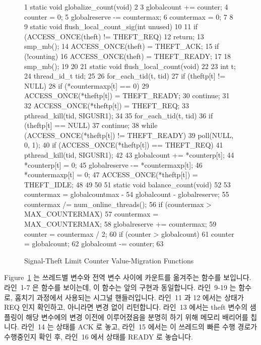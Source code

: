 \begin{figure}[tbp]
{ \scriptsize
\begin{verbbox}
  1 static void globalize_count(void)
  2 {
  3   globalcount += counter;
  4   counter = 0;
  5   globalreserve -= countermax;
  6   countermax = 0;
  7 }
  8 
  9 static void flush_local_count_sig(int unused)
 10 {
 11   if (ACCESS_ONCE(theft) != THEFT_REQ)
 12     return;
 13   smp_mb();
 14   ACCESS_ONCE(theft) = THEFT_ACK;
 15   if (!counting) {
 16     ACCESS_ONCE(theft) = THEFT_READY;
 17   }
 18   smp_mb();
 19 }
 20 
 21 static void flush_local_count(void)
 22 {
 23   int t;
 24   thread_id_t tid;
 25 
 26   for_each_tid(t, tid)
 27     if (theftp[t] != NULL) {
 28       if (*countermaxp[t] == 0) {
 29         ACCESS_ONCE(*theftp[t]) = THEFT_READY;
 30         continue;
 31       }
 32       ACCESS_ONCE(*theftp[t]) = THEFT_REQ;
 33       pthread_kill(tid, SIGUSR1);
 34     }
 35   for_each_tid(t, tid) {
 36     if (theftp[t] == NULL)
 37       continue;
 38     while (ACCESS_ONCE(*theftp[t]) != THEFT_READY) {
 39       poll(NULL, 0, 1);
 40       if (ACCESS_ONCE(*theftp[t]) == THEFT_REQ)
 41         pthread_kill(tid, SIGUSR1);
 42     }
 43     globalcount += *counterp[t];
 44     *counterp[t] = 0;
 45     globalreserve -= *countermaxp[t];
 46     *countermaxp[t] = 0;
 47     ACCESS_ONCE(*theftp[t]) = THEFT_IDLE;
 48   }
 49 }
 50 
 51 static void balance_count(void)
 52 {
 53   countermax = globalcountmax -
 54     globalcount - globalreserve;
 55   countermax /= num_online_threads();
 56   if (countermax > MAX_COUNTERMAX)
 57     countermax = MAX_COUNTERMAX;
 58   globalreserve += countermax;
 59   counter = countermax / 2;
 60   if (counter > globalcount)
 61     counter = globalcount;
 62   globalcount -= counter;
 63 }
\end{verbbox}
}
\centering
\theverbbox
\caption{Signal-Theft Limit Counter Value-Migration Functions}
\label{fig:count:Signal-Theft Limit Counter Value-Migration Functions}
\end{figure}

Figure~\ref{fig:count:Signal-Theft Limit Counter Value-Migration Functions}
는 쓰레드별 변수와 전역 변수 사이에 카운트를 옮겨주는 함수를 보입니다.
라인~1-7 은  함수를 보이는데, 이 함수는 앞의 구현과
동일합니다.
라인~9-19 는  함수로, 훔치기 과정에서 사용되는
시그널 핸들러입니다.
라인~11 과 12 에서는  상태가 REQ 인지 확인하고, 아니라면 변경 없이
리턴합니다.
라인~13 에서는 theft 변수의 샘플링이 해당 변수에의 변경 이전에 이루어졌음을
분명히 하기 위해 메모리 배리어를 칩니다.
라인~14 는  상태를 ACK 로 놓고, 라인~15 에서는 이 쓰레드의 빠른 수행
경로가 수행중인지 확인 후, 라인~16 에서  상태를 READY 로 놓습니다.
\iffalse

